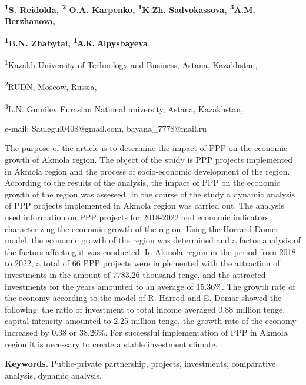 \begin{center}
{\bfseries \textsuperscript{1}S. Reidolda\envelope,
\textsuperscript{2} O.A. Karpenko, \textsuperscript{1}K.Zh.
Sadvokassova, \textsuperscript{3}A.M. Berzhanova,}

{\bfseries \textsuperscript{1}B.N. Zhabytai\envelope,
\textsuperscript{1}А.К.} {\bfseries Аlpysbayeva}

\textsuperscript{1}Kazakh University of Technology and Business, Astana,
Kazakhstan,

\textsuperscript{2}RUDN, Moscow, Russia,

\textsuperscript{3}L.N. Gumilev Eurasian National university, Astana,
Kazakhstan,

e-mail: Saulegul0408@gmail.com, bayana\_7778@mail.ru
\end{center}

The purpose of the article is to determine the impact of PPP on the
economic growth of Akmola region. The object of the study is PPP
projects implemented in Akmola region and the process of socio-economic
development of the region. According to the results of the analysis, the
impact of PPP on the economic growth of the region was assessed. In the
course of the study a dynamic analysis of PPP projects implemented in
Akmola region was carried out. The analysis used information on PPP
projects for 2018-2022 and economic indicators characterizing the
economic growth of the region. Using the Horrard-Domer model, the
economic growth of the region was determined and a factor analysis of
the factors affecting it was conducted. In Akmola region in the period
from 2018 to 2022, a total of 66 PPP projects were implemented with the
attraction of investments in the amount of 7783.26 thousand tenge, and
the attracted investments for the years amounted to an average of
15.36\%. The growth rate of the economy according to the model of R.
Harrod and E. Domar showed the following: the ratio of investment to
total income averaged 0.88 million tenge, capital intensity amounted to
2.25 million tenge, the growth rate of the economy increased by 0.38 or
38.26\%. For successful implementation of PPP in Akmola region it is
necessary to create a stable investment climate.

{\bfseries Keywords.} Public-private partnership, projects, investments,
comparative analysis, dynamic analysis.

